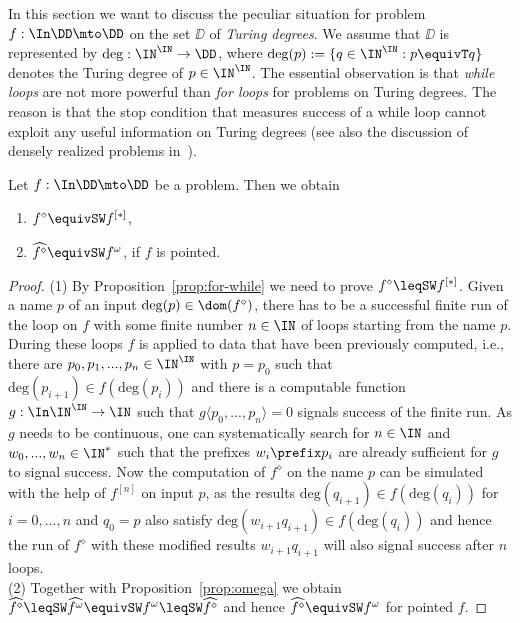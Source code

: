 \documentclass{lmcs}
\def\deg{\mathrm{deg}}
\begin{document}
In this section we want to discuss the peculiar situation for problem $f:\In\DD\mto\DD$ on the set
$\DD$ of {\em Turing degrees}. We assume that $\DD$ is represented by $\deg:\IN^\IN\to\DD$,
where $\deg(p):=\{q\in\IN^\IN:p\equivT q\}$ denotes the Turing degree of $p\in\IN^\IN$.
The essential observation is that {\em while loops} are not more powerful than {\em for loops} for problems
on Turing degrees. The reason is that the stop condition that measures success of a while loop
cannot exploit any useful information on Turing degrees (see also the discussion of densely realized problems
in~\cite{BHK17a,BP18}).

\begin{prop}
\label{prop:Turing}
Let ${f:\In\DD\mto\DD}$ be a problem. Then we obtain 
\begin{enumerate}
\item $f^\diamond\equivSW f^{[*]}$,
\item $\widehat{f^\diamond}\equivSW f^\omega$, if $f$ is pointed.
\end{enumerate}
\end{prop}
\begin{proof}
(1) By Proposition~\ref{prop:for-while} we need to prove $f^\diamond\leqSW f^{[*]}$.
Given a name $p$ of an input $\deg(p)\in\dom(f^\diamond)$, there has to be a successful finite run of the loop on $f$
with some finite number $n\in\IN$ of loops starting from the name $p$. 
During these loops $f$ is applied to data that have been previously computed, i.e., there are
$p_0,p_1,...,p_n\in\IN^\IN$ with $p=p_0$ such that $\deg(p_{i+1})\in f(\deg(p_i))$ and there is a computable 
function $g:\In\IN^\IN\to\IN$
such that $g\langle p_0,...,p_n\rangle=0$ signals success of the finite run. As $g$ needs to be continuous,
one can systematically search for $n\in\IN$ and $w_0,...,w_n\in\IN^*$ such that
the prefixes $w_i\prefix p_i$ are already sufficient for $g$ to signal success.
Now the computation of $f^\diamond$ on the name $p$ can be simulated with 
the help of $f^{[n]}$ on input $p$, as the results $\deg(q_{i+1})\in f(\deg(q_i))$ for $i=0,...,n$ and $q_0=p$
also satisfy $\deg(w_{i+1}q_{i+1})\in f(\deg(q_i))$ and hence the run of $f^\diamond$ with these modified
results $w_{i+1}q_{i+1}$ will also signal success after $n$ loops. \\
(2) Together with Proposition~\ref{prop:omega} we obtain $\widehat{f^\diamond}\leqSW \widehat{f^\omega}\equivSW f^\omega\leqSW\widehat{f^\diamond}$ and hence $\widehat{f^\diamond}\equivSW f^\omega$ for pointed $f$.
\end{proof}
\end{document}
